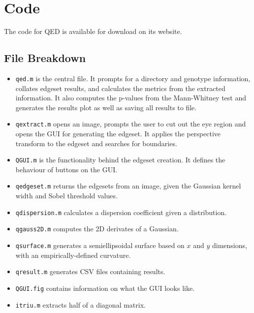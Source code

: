 \documentclass[a4paper,11pt]{article}
\begin{document}

\section{Code}

The code for QED is available for download on its website.

\subsection{File Breakdown}

\begin{itemize}
 \item \texttt{qed.m} is the central file. It prompts for a directory and genotype information, collates edgeset results, and calculates the metrics from the extracted information. It also computes the p-values from the Mann-Whitney test and generates the results plot as well as saving all results to file.
 \item \texttt{qextract.m} opens an image, prompts the user to cut out the eye region and opens the GUI for generating the edgeset. It applies the perspective transform to the edgeset and searches for boundaries.
 \item \texttt{QGUI.m} is the functionality behind the edgeset creation. It defines the behaviour of buttons on the GUI.
 \item \texttt{qedgeset.m} returns the edgesets from an image, given the Gaussian kernel width and Sobel threshold values.
 \item \texttt{qdispersion.m} calculates a dispersion coefficient given a distribution.
 \item \texttt{qgauss2D.m} computes the 2D derivates of a Gaussian.
 \item \texttt{qsurface.m} generates a semiellipsoidal surface based on $x$ and $y$ dimensions, with an empirically-defined curvature.
 \item \texttt{qresult.m} generates CSV files containing results.
 \item \texttt{QGUI.fig} contains information on what the GUI looks like.
 \item \texttt{itriu.m} extracts half of a diagonal matrix.
\end{itemize}
\end{document}
